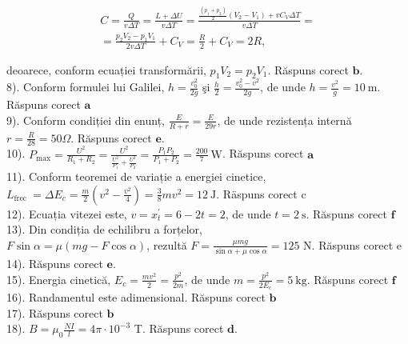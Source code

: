$$
\begin{gathered}
C=\frac{Q}{v \Delta T}=\frac{L+\Delta U}{v \Delta T}=\frac{\frac{\left(p_{1}+p_{2}\right)}{2}\left(V_{2}-V_{1}\right)+v C_{V} \Delta T}{v \Delta T}= \\
=\frac{p_{2} V_{2}-p_{1} V_{1}}{2 v \Delta T}+C_{V}=\frac{R}{2}+C_{V}=2 R,
\end{gathered}
$$

deoarece, conform ecuației transformării, $p_{1} V_{2}=p_{2} V_{1}$. Răspuns corect $\boldsymbol{b}$.\\
8). Conform formulei lui Galilei, $h=\frac{v_{0}^{2}}{2 g}$ şi $\frac{h}{2}=\frac{v_{0}^{2}-v^{2}}{2 g}$, de unde $h=\frac{v^{2}}{g}=10 \mathrm{~m}$. Răspuns corect $\boldsymbol{a}$\\
9). Conform condiției din enunț, $\frac{E}{R+r}=\frac{E}{29 r}$, de unde rezistența internă $r=\frac{R}{28}=50 \Omega$. Răspuns corect $\boldsymbol{e}$.\\
10). $P_{\max }=\frac{U^{2}}{R_{1}+R_{2}}=\frac{U^{2}}{\frac{U^{2}}{P_{1}}+\frac{U^{2}}{P_{2}}}=\frac{P_{1} P_{2}}{P_{1}+P_{2}}=\frac{200}{7} \mathrm{~W}$. Răspuns corect $\boldsymbol{a}$\\
11). Conform teoremei de variație a energiei cinetice, $L_{\text {frec }}=\Delta E_{c}=\frac{m}{2}\left(v^{2}-\frac{v^{2}}{4}\right)=\frac{3}{8} m v^{2}=12 \mathrm{~J}$. Räspuns corect c\\
12). Ecuația vitezei este, $v=x_{t}^{\prime}=6-2 t=2$, de unde $t=2 \mathrm{~s}$. Răspuns corect $\boldsymbol{f}$\\
13). Din condiția de echilibru a forțelor,\\
$F \sin \alpha=\mu(m g-F \cos \alpha)$, rezultă $F=\frac{\mu m g}{\sin \alpha+\mu \cos \alpha}=125$ N. Răspuns corect e\\
14). Răspuns corect $\boldsymbol{e}$.\\
15). Energia cinetică, $E_{c}=\frac{m v^{2}}{2}=\frac{p^{2}}{2 m}$, de unde $m=\frac{p^{2}}{2 E_{c}}=5 \mathrm{~kg}$. Răspuns corect $\boldsymbol{f}$\\
16). Randamentul este adimensional. Răspuns corect $\boldsymbol{b}$\\
17). Răspuns corect $\boldsymbol{b}$\\
18). $B=\mu_{0} \frac{N I}{l}=4 \pi \cdot 10^{-3}$ T. Răspuns corect $\boldsymbol{d}$.

